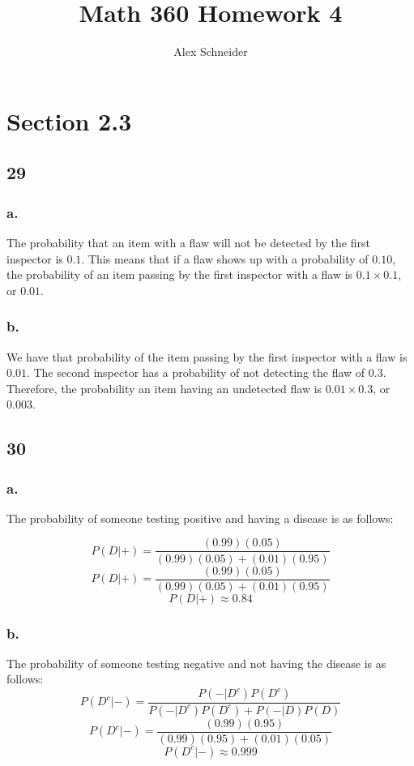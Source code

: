 \documentclass[11pt]{article}
\title{Math 360  Homework 4}
\author{Alex Schneider}
\begin{document}
\maketitle
\section*{Section 2.3}
\subsection*{29}
\subsubsection*{a.}
The probability that an item with a flaw will not be detected by the first
inspector is $0.1$. This means that if a flaw shows up with a probability of
$0.10$, the probability of an item passing by the first inspector with a flaw is
$0.1 \times 0.1$, or $0.01$. 

\subsubsection*{b.}
We have that probability of the item passing by the first inspector with a flaw is $0.01$. The
second inspector has a probability of not detecting the flaw of $0.3$.
Therefore, the probability an item having an undetected flaw is $0.01 \times 0.3$,
or $0.003$. 

\subsection*{30}
\subsubsection*{a.}
The probability of someone testing positive and having a disease is as follows:

\[P(D|+) = \frac{(0.99)(0.05)}{(0.99)(0.05)+(0.01)(0.95)}\]
\[P(D|+) = \frac{(0.99)(0.05)}{(0.99)(0.05)+(0.01)(0.95)}\]
\[P(D|+) \approx 0.84\]

\subsubsection*{b.}
The probability of someone testing negative and not having the disease is as
follows:
\[P(D^c|-) = \frac{P(-|D^c)P(D^c)}{P(-|D^c)P(D^c)+P(-|D)P(D)} \]
\[P(D^c|-) = \frac{(0.99)(0.95)}{(0.99)(0.95)+(0.01)(0.05)} \]
\[P(D^c|-) \approx 0.999 \]
\end{document}
